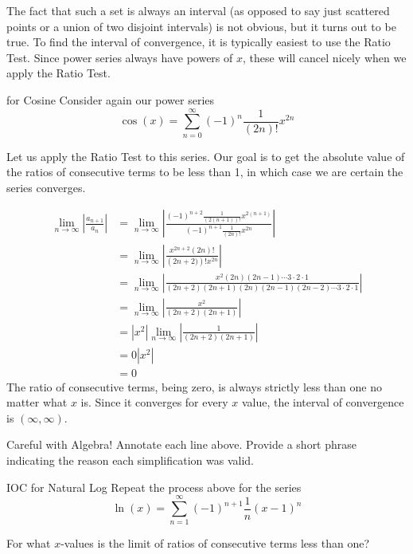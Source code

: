 The fact that such a set is always an interval (as opposed to say just scattered points or a union of two disjoint intervals) is not obvious, but it turns out to be true.  To find the interval of convergence, it is typically easiest to use the Ratio Test.  Since power series always have powers of $x$, these will cancel nicely when we apply the Ratio Test.

\begin{example}{ for Cosine}
Consider again our power series 
$$ \cos(x)=\sum_{n=0}^\infty (-1)^{n}\frac{1}{\left(2n\right)!}x^{2n}$$

Let us apply the Ratio Test to this series.  Our goal is to get the absolute value of the ratios of consecutive terms to be less than 1, in which case we are certain the series converges.

\begin{align*}
\lim_{n \rightarrow \infty}\left| \frac{a_{n+1}}{a_n} \right| &=\lim_{n \rightarrow \infty} \left|\frac{(-1)^{n+2}\frac{1}{\left(2(n+1)\right)!}x^{2(n+1)}}{(-1)^{n+1}\frac{1}{\left(2n\right)!}x^{2n}} \right| \\
 &=\lim_{n \rightarrow \infty} \left|\frac{x^{2n+2}\left(2n\right)!}{\left(2n+2)\right)!x^{2n}} \right| \\
 &=\lim_{n \rightarrow \infty} \left|\frac{x^{2}\left(2n\right)\left(2n-1\right)\cdots 3\cdot 2 \cdot 1}{\left(2n+2\right)\left(2n+1\right)\left(2n\right)\left(2n-1\right)\left(2n-2\right)\cdots 3\cdot 2 \cdot 1} \right| \\
 &=\lim_{n \rightarrow \infty} \left|\frac{x^{2}}{\left(2n+2\right)\left(2n+1\right)} \right| \\
 &=\left|x^2 \right| \lim_{n \rightarrow \infty} \left|\frac{1}{\left(2n+2\right)\left(2n+1\right)} \right| \\
 &=0\left|x^2 \right| \\
 &=0
\end{align*}
The ratio of consecutive terms, being zero, is always strictly less than one no matter what $x$ is.  Since it converges for every $x$ value, the interval of convergence is $(\infty, \infty)$.
\end{example}

\begin{exercise}{Careful with Algebra! \Coffeecup}
Annotate each line above. Provide a short phrase indicating the reason each simplification was valid.
\end{exercise}

\begin{exercise}{IOC for Natural Log \Coffeecup \Coffeecup \Coffeecup}
Repeat the process above for the series $$ \ln(x)=\sum_{n=1}^\infty (-1)^{n+1}\frac{1}{n}(x-1)^{n}$$

For what $x$-values is the limit of ratios of consecutive terms less than one?

\vspace*{3in}

\end{exercise}

